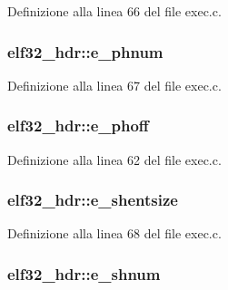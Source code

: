 Definizione alla linea 66 del file exec.\+c.

\hypertarget{structelf32__hdr_ae97c82a1bab1e0bf6de2d4ad0f6eef79}{
\subsubsection[{e\+\_\+phnum}]{ elf32\+\_\+hdr\+::e\+\_\+phnum}}\label{structelf32__hdr_ae97c82a1bab1e0bf6de2d4ad0f6eef79}


Definizione alla linea 67 del file exec.\+c.

\hypertarget{structelf32__hdr_a88337612d820200d75185c304124ad24}{
\subsubsection[{e\+\_\+phoff}]{ elf32\+\_\+hdr\+::e\+\_\+phoff}}\label{structelf32__hdr_a88337612d820200d75185c304124ad24}


Definizione alla linea 62 del file exec.\+c.

\hypertarget{structelf32__hdr_a8ca2eaada4cff245f41faa852a4a248e}{
\subsubsection[{e\+\_\+shentsize}]{ elf32\+\_\+hdr\+::e\+\_\+shentsize}}\label{structelf32__hdr_a8ca2eaada4cff245f41faa852a4a248e}


Definizione alla linea 68 del file exec.\+c.

\hypertarget{structelf32__hdr_ab7d153e79bf2dca73049268f1fcd79c6}{
\subsubsection[{e\+\_\+shnum}]{ elf32\+\_\+hdr\+::e\+\_\+shnum}}\label{structelf32__hdr_ab7d153e79bf2dca73049268f1fcd79c6}


